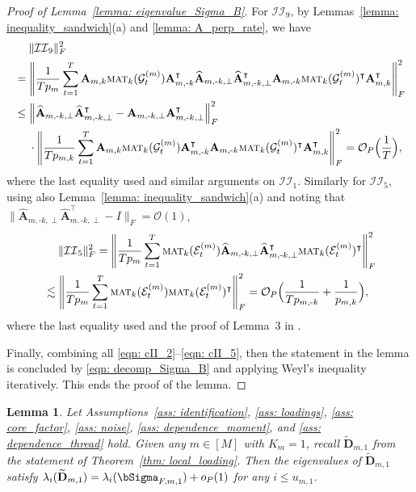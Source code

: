 \documentclass[aos]{imsart}
\theoremstyle{plain}
\newtheorem{lemma}[theorem]{Lemma}
\theoremstyle{definition}
\def\mat{\textnormal{\textsc{mat}}}
\def\wt#1{\widetilde{#1}}
\def\wh#1{\widehat{#1}}
\def\cE{\mathcal{E}}
\def\cG{\mathcal{G}} \def\cH{\boldsymbol{\mathcal{H}}} \def\cI{\mathcal{I}}
\def\cII{\mathcal{II}}
\def\cO{\mathcal{O}}
\def\bA{\mathbf{A}}
\def\bD{\mathbf{D}}
\def\trans{\intercal}
\begin{document}
\begin{proof}[Proof of Lemma~\ref{lemma: eigenvalue_Sigma_B}]
For $\cII_9$, by Lemmas~\ref{lemma: inequality_sandwich}(a) and \ref{lemma: A_perp_rate}, we have
\begin{align}
    &\;\quad
    \|\cII_9\|_F^2 \notag \\
    &=
    \Bigg\| \frac{1}{Tp_m} \sum_{t=1}^T \bA_{m,k} \mat_k(\cG_t^{(m)}) \bA_{m,\text{-}k}^\trans \wh{\bA}_{m,\text{-}k,\perp} \wh{\bA}_{m,\text{-}k,\perp}^\trans \bA_{m,\text{-}k} \mat_k(\cG_t^{(m)})^\trans \bA_{m,k}^\trans \Bigg\|_F^2 \notag \\
    &\leq
    \Big\| \wh{\bA}_{m,\text{-}k,\perp} \wh{\bA}_{m,\text{-}k,\perp}^\trans - \bA_{m,\text{-}k,\perp} \bA_{m,\text{-}k,\perp}^\trans \Big\|_F^2 \notag \\
    &\;\quad
    \cdot \Bigg\| \frac{1}{T p_{m,k}} \sum_{t=1}^T \bA_{m,k} \mat_k(\cG_t^{(m)}) \bA_{m,\text{-}k}^\trans \bA_{m,\text{-}k} \mat_k(\cG_t^{(m)})^\trans \bA_{m,k}^\trans \Bigg\|_F^2
    = \cO_P\Big( \frac{1}{T} \Big) ,
    \label{eqn: cII_9}
\end{align}
where the last equality used  and similar arguments on $\cII_1$. Similarly for $\cII_5$, using also Lemma~\ref{lemma: inequality_sandwich}(a) and noting that $\big\| \wh{\bA}_{m,\text{-}k,\perp} \wh{\bA}_{m,\text{-}k,\perp}^\trans -I \big\|_F =\cO(1)$,
\begin{align}
    &\;\quad
    \|\cII_5\|_F^2 = \Bigg\| \frac{1}{Tp_m} \sum_{t=1}^T \mat_k(\cE_t^{(m)}) \wh{\bA}_{m,\text{-}k,\perp} \wh{\bA}_{m,\text{-}k,\perp}^\trans \mat_k(\cE_t^{(m)})^\trans \Bigg\|_F^2 \notag \\
    &\lesssim
    \Bigg\| \frac{1}{Tp_m} \sum_{t=1}^T \mat_k(\cE_t^{(m)}) \mat_k(\cE_t^{(m)})^\trans \Bigg\|_F^2
    = \cO_P\Big( \frac{1}{T p_{m,\text{-}k}} + \frac{1}{p_{m,k}} \Big) ,
    \label{eqn: cII_5}
\end{align}
where the last equality used  and the proof of Lemma~3 in \cite{barigozzi2022statistical}.

Finally, combining all \eqref{eqn: cII_2}--\eqref{eqn: cII_5}, then the statement in the lemma is concluded by \eqref{eqn: decomp_Sigma_B} and applying Weyl's inequality iteratively. This ends the proof of the lemma.
\end{proof}




\begin{lemma}\label{lemma: eigenvalue_tilde_Sigma_B}
Let Assumptions~\ref{ass: identification}, \ref{ass: loadings}, \ref{ass: core_factor}, \ref{ass: noise}, \ref{ass: dependence_moment}, and \ref{ass: dependence_thread} hold.
Given any $m\in[M]$ with $K_m= 1$, recall $\wt{\bD}_{m,1}$ from the statement of Theorem~\ref{thm: local_loading}.
Then the eigenvalues of $\wt{\bD}_{m,1}$ satisfy $\lambda_i(\wt{\bD}_{m,1}) = \lambda_i(\bSigma_{F,m,1}) + o_P(1)$ for any $i\leq u_{m,1}$.
\end{lemma}
\end{document}
